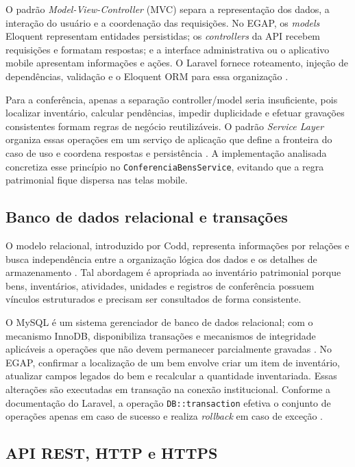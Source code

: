 \documentclass[12pt,a4paper]{article}
\begin{document}
O padrão \textit{Model-View-Controller} (MVC) separa a representação dos
dados, a interação do usuário e a coordenação das requisições. No EGAP, os
\textit{models} Eloquent representam entidades persistidas; os
\textit{controllers} da API recebem requisições e formatam respostas; e a
interface administrativa ou o aplicativo mobile apresentam informações e
ações. O Laravel fornece roteamento, injeção de dependências, validação e o
Eloquent ORM para essa organização \cite{laravelrouting,laraveleloquent}.

Para a conferência, apenas a separação controller/model seria insuficiente,
pois localizar inventário, calcular pendências, impedir duplicidade e efetuar
gravações consistentes formam regras de negócio reutilizáveis. O padrão
\textit{Service Layer} organiza essas operações em um serviço de aplicação que
define a fronteira do caso de uso e coordena respostas e persistência
\cite{fowlerServiceLayer}. A implementação analisada concretiza esse princípio
no \texttt{ConferenciaBensService}, evitando que a regra patrimonial fique
dispersa nas telas mobile.

\subsection{Banco de dados relacional e transações}

O modelo relacional, introduzido por Codd, representa informações por relações
e busca independência entre a organização lógica dos dados e os detalhes de
armazenamento \cite{codd1970}. Tal abordagem é apropriada ao inventário
patrimonial porque bens, inventários, atividades, unidades e registros de
conferência possuem vínculos estruturados e precisam ser consultados de forma
consistente.

O MySQL é um sistema gerenciador de banco de dados relacional; com o mecanismo
InnoDB, disponibiliza transações e mecanismos de integridade aplicáveis a
operações que não devem permanecer parcialmente gravadas
\cite{mysqlTransactions,mysqlForeignKeys}. No EGAP, confirmar a localização de
um bem envolve criar um item de inventário, atualizar campos legados do bem e
recalcular a quantidade inventariada. Essas alterações são executadas em
transação na conexão institucional. Conforme a documentação do Laravel, a
operação \texttt{DB::transaction} efetiva o conjunto de operações apenas em
caso de sucesso e realiza \textit{rollback} em caso de exceção
\cite{laraveldatabase}.

\subsection{API REST, HTTP e HTTPS}
\end{document}
